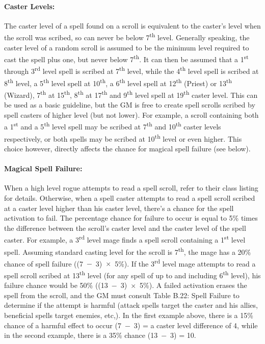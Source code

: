 \begin{multicols}{2}
\paragraph{Caster Levels:} The caster level of a spell found on a scroll is equivalent to the caster's level when the scroll was scribed, so can never be below 7\textsuperscript{th} level.  Generally speaking, the caster level of a random scroll is assumed to be the minimum level required to cast the spell plus one, but never below 7\textsuperscript{th}.  It can then be assumed that a 1\textsuperscript{st} through 3\textsuperscript{rd} level spell is scribed at 7\textsuperscript{th} level, while the 4\textsuperscript{th} level spell is scribed at 8\textsuperscript{th} level, a 5\textsuperscript{th} level spell at 10\textsuperscript{th}, a 6\textsuperscript{th} level spell at 12\textsuperscript{th} (Priest) or 13\textsuperscript{th} (Wizard), 7\textsuperscript{th} at 15\textsuperscript{th}, 8\textsuperscript{th} at 17\textsuperscript{th} and 9\textsuperscript{th} level spell at 19\textsuperscript{th} caster level.  This can be used as a basic guideline, but the GM is free to create spell scrolls scribed by spell casters of higher level (but not lower).  For example, a scroll containing both a 1\textsuperscript{st} and a 5\textsuperscript{th} level spell may be scribed at 7\textsuperscript{th} and 10\textsuperscript{th} caster levels respectively, or both spells may be scribed at 10\textsuperscript{th} level or even higher.  This choice however, directly affects the chance for magical spell failure (see below).

\paragraph{Magical Spell Failure:} When a high level rogue attempts to read a spell scroll, refer to their class listing for details.  Otherwise, when a spell caster attempts to read a spell scroll scribed at a caster level higher than his caster level, there's a chance for the spell activation to fail.  The percentage chance for failure to occur is equal to 5\% times the difference between the scroll's caster level and the caster level of the spell caster.  For example, a 3\textsuperscript{rd} level mage finds a spell scroll containing a 1\textsuperscript{st} level spell.  Assuming standard casting level for the scroll is 7\textsuperscript{th}, the mage has a 20\% chance of spell failure ((7~$-$~3)~$\times$~5\%).  If the 3\textsuperscript{rd} level mage attempts to read a spell scroll scribed at 13\textsuperscript{th} level (for any spell of up to and including 6\textsuperscript{th} level), his failure chance would be 50\% ((13~$-$~3)~$\times$~5\%).  A failed activation erases the spell from the scroll, and the GM must consult Table B.22: Spell Failure to determine if the attempt is harmful (attack spells target the caster and his allies, beneficial spells target enemies, etc,).  In the first example above, there is a 15\% chance of a harmful effect to occur (7~$-$~3) = a caster level difference of 4, while in the second example, there is a 35\% chance (13~$-$~3) = 10.


\end{multicols}
